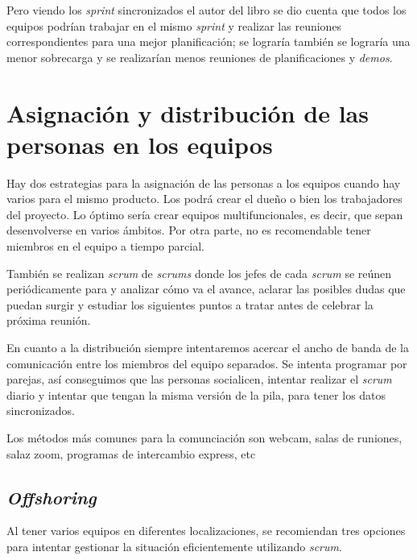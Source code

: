 Pero viendo los \textit{sprint} sincronizados el autor del libro se dio cuenta que todos los equipos podrían trabajar en el mismo \textit{sprint} y realizar las reuniones correspondientes para una mejor planificación; se lograría también se lograría una menor sobrecarga y se realizarían menos reuniones de planificaciones y \textit{demos}.


\section{Asignación y distribución de las personas en los equipos}

Hay dos estrategias para la asignación de las personas a los equipos cuando hay varios para el mismo producto. Los podrá crear el dueño o bien los trabajadores del proyecto. Lo óptimo sería crear equipos multifuncionales, es decir, que sepan desenvolverse en varios ámbitos. Por otra parte, no es recomendable tener miembros en el equipo a tiempo parcial.

También se realizan \textit{scrum} de \textit{scrums} donde los jefes de cada \textit{scrum} se reúnen periódicamente para y analizar cómo va el avance, aclarar las posibles dudas que puedan surgir y estudiar los siguientes puntos a tratar antes de celebrar la próxima reunión. 

En cuanto a la distribución siempre intentaremos acercar el ancho de banda de la comunicación entre los miembros del equipo separados. Se intenta programar por parejas, así conseguimos que las personas socialicen, intentar realizar el \textit{scrum} diario y intentar que tengan la misma versión de la pila, para tener los datos sincronizados.

	Los métodos más comunes para la comunciación son webcam, salas de runiones, salaz zoom, programas de intercambio express, etc

\subsection{\textit{Offshoring}}

Al tener varios equipos en diferentes localizaciones, se recomiendan tres opciones para intentar gestionar la situación eficientemente utilizando \textit{scrum}.


